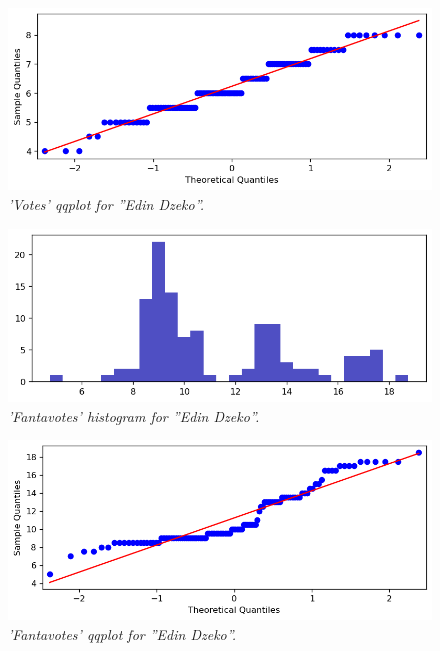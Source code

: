 \begin{figure}[H]
  \includegraphics[scale=0.5]{images/dzeko_normality_test_voti_qqplot.png}
   \centering  
   \caption{\textit{'Votes' qqplot for ''Edin Dzeko''.}}
  \label{fig:qqplot_votes}
\end{figure}

\begin{figure}[H]
  \includegraphics[scale=0.5]{images/dzeko_normality_test_fantavoti_barchart.png}
   \centering  
   \caption{\textit{'Fantavotes' histogram for ''Edin Dzeko''.}}
  \label{fig:hist_fantavotes}
\end{figure}

\begin{figure}[H]
  \includegraphics[scale=0.5]{images/dzeko_normality_test_fantavoti_qqplot.png}
   \centering  
   \caption{\textit{'Fantavotes' qqplot for ''Edin Dzeko''.}}
  \label{fig:qqplot_fantavotes}
\end{figure}






  
